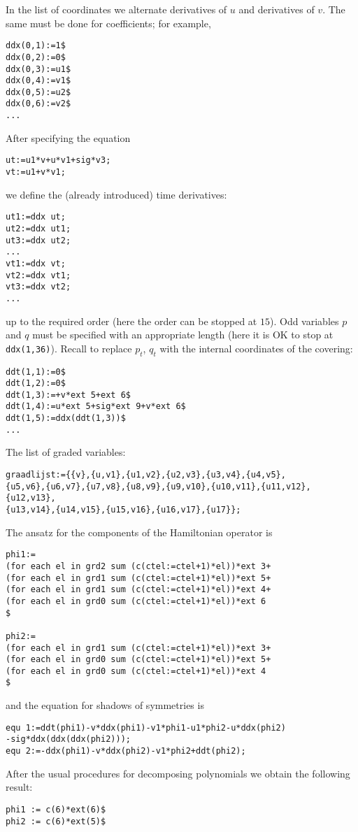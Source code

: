 \documentclass[12pt]{amsart}
\theoremstyle{definition}
\begin{document}
In the list of coordinates we alternate derivatives of $u$ and derivatives of
$v$. The same must be done for coefficients; for example,
\begin{verbatim}
ddx(0,1):=1$
ddx(0,2):=0$
ddx(0,3):=u1$
ddx(0,4):=v1$
ddx(0,5):=u2$
ddx(0,6):=v2$
...
\end{verbatim}
After specifying the equation
\begin{verbatim}
ut:=u1*v+u*v1+sig*v3;
vt:=u1+v*v1;
\end{verbatim}
we define the (already introduced) time derivatives:
\begin{verbatim}
ut1:=ddx ut;
ut2:=ddx ut1;
ut3:=ddx ut2;
...
vt1:=ddx vt;
vt2:=ddx vt1;
vt3:=ddx vt2;
...
\end{verbatim}
up to the required order (here the order can be stopped at $15$).  Odd
variables $p$ and $q$ must be specified with an appropriate length (here it is
OK to stop at \texttt{ddx(1,36)}). Recall to replace $p_t$, $q_t$ with the
internal coordinates of the covering:
\begin{verbatim}
ddt(1,1):=0$
ddt(1,2):=0$
ddt(1,3):=+v*ext 5+ext 6$
ddt(1,4):=u*ext 5+sig*ext 9+v*ext 6$
ddt(1,5):=ddx(ddt(1,3))$
...
\end{verbatim}
The list of graded variables:
\begin{verbatim}
graadlijst:={{v},{u,v1},{u1,v2},{u2,v3},{u3,v4},{u4,v5},
{u5,v6},{u6,v7},{u7,v8},{u8,v9},{u9,v10},{u10,v11},{u11,v12},{u12,v13},
{u13,v14},{u14,v15},{u15,v16},{u16,v17},{u17}};
\end{verbatim}
The ansatz for the components of the Hamiltonian operator is
\begin{verbatim}
phi1:=
(for each el in grd2 sum (c(ctel:=ctel+1)*el))*ext 3+
(for each el in grd1 sum (c(ctel:=ctel+1)*el))*ext 5+
(for each el in grd1 sum (c(ctel:=ctel+1)*el))*ext 4+
(for each el in grd0 sum (c(ctel:=ctel+1)*el))*ext 6
$

phi2:=
(for each el in grd1 sum (c(ctel:=ctel+1)*el))*ext 3+
(for each el in grd0 sum (c(ctel:=ctel+1)*el))*ext 5+
(for each el in grd0 sum (c(ctel:=ctel+1)*el))*ext 4
$
\end{verbatim}
and the equation for shadows of symmetries is
\begin{verbatim}
equ 1:=ddt(phi1)-v*ddx(phi1)-v1*phi1-u1*phi2-u*ddx(phi2)
-sig*ddx(ddx(ddx(phi2)));
equ 2:=-ddx(phi1)-v*ddx(phi2)-v1*phi2+ddt(phi2);
\end{verbatim}
After the usual procedures for decomposing polynomials we obtain the following
result:
\begin{verbatim}
phi1 := c(6)*ext(6)$
phi2 := c(6)*ext(5)$
\end{verbatim}
\end{document}
